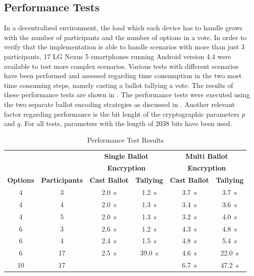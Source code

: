 \documentclass[numbers=noenddot, abstract=on, a4paper, headsepline,
footsepline, oneside, draft=off]{scrreprt}
\begin{document}
\subsection{Performance Tests}
\label{sec:performancetests}
In a decentralized environment, the load which each device has to handle grows
with the number of participants and the number of options in a vote. In order to
verify that the implementation is able to handle scenarios with more than just
3 participants, 17 LG Nexus 5 smartphones running Android version 4.4 were
available to test more complex scenarios. Various tests with different scenarios
have been performed and assessed regarding time consumption in the two most time
consuming steps, namely casting a ballot tallying a vote. The results of these
performance tests are shown in . The performance tests
were executed using the two separate ballot encoding strategies as discussed in
. Another relevant factor regarding performance is the
bit lenght of the cryptographic parameters $p$ and $q$. For all tests,
parameters with the length of 2038 bits have been used.

\begin{table}[htbp]
	\centering
	\renewcommand{\arraystretch}{1.4}
	\begin{minipage}{\linewidth}
	\begin{tabularx}{\textwidth}{cccccc}
		\toprule
		& & \multicolumn{2}{c}{\textbf{Single Ballot}} &
		\multicolumn{2}{c}{\textbf{Multi Ballot}} \\
		& & \multicolumn{2}{c}{\textbf{Encryption}} &
		\multicolumn{2}{c}{\textbf{Encryption}} \\
		\textbf{Options}	&  \textbf{Participants} & \textbf{Cast Ballot} &
		\textbf{Tallying} & \textbf{Cast Ballot} &	\textbf{Tallying}
		\\
		\midrule
		4 & 3 & \SI{2.0}{\second} & \SI{1.2}{\second} & \SI{3.7}{\second} & 
		\SI{3.7}{\second} \\
		4 & 4 & \SI{2.0}{\second} & \SI{1.3}{\second} & \SI{3.4}{\second} &	
		\SI{3.6}{\second} \\
		4 & 5 & \SI{2.0}{\second} & \SI{1.3}{\second} & \SI{3.2}{\second} & 
		\SI{4.0}{\second} \\
		6 & 3 & \SI{2.6}{\second} & \SI{1.2}{\second} & \SI{4.3}{\second} &	
		\SI{4.8}{\second} \\
		6 & 4 & \SI{2.4}{\second} & \SI{1.5}{\second} & \SI{4.8}{\second} &	
		\SI{5.4}{\second} \\
		6 & 17 & \SI{2.5}{\second} & \SI{39.0}{\second} & \SI{4.6}{\second} & 
		\SI{22.0}{\second} \\
		10 & 17 &  &  & \SI{6.7}{\second} &	
		\SI{47.2}{\second} \\
		\bottomrule
	\end{tabularx}
	\end{minipage}
	\renewcommand{\arraystretch}{1}
	\caption{Performance Test Results}
	\label{tab:perftestresults}
\end{table}
\end{document}
